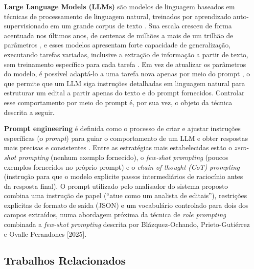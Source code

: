 \documentclass[12pt]{article}
\begin{document}
  \textbf{Large Language Models (LLMs)} são modelos de linguagem baseados em técnicas de processamento de linguagem natural, treinados por aprendizado auto-supervisionado em um grande corpus de texto \cite{b7}. Sua escala cresceu de forma acentuada nos últimos anos, de centenas de milhões a mais de um trilhão de parâmetros \cite{b7}, e esses modelos apresentam forte capacidade de generalização, executando tarefas variadas, inclusive a extração de informação a partir de texto, sem treinamento específico para cada tarefa \cite{b7}. Em vez de atualizar os parâmetros do modelo, é possível adaptá-lo a uma tarefa nova apenas por meio do prompt \cite{b5}, o que permite que um LLM siga instruções detalhadas em linguagem natural para estruturar um edital a partir apenas do texto e do prompt fornecidos. Controlar esse comportamento por meio do prompt é, por sua vez, o objeto da técnica descrita a seguir.

  \textbf{Prompt engineering} é definida como o processo de criar e ajustar instruções específicas (o \emph{prompt}) para guiar o comportamento de um LLM e obter respostas mais precisas e consistentes \cite{b5,b1}. Entre as estratégias mais estabelecidas estão o \emph{zero-shot prompting} (nenhum exemplo fornecido), o \emph{few-shot prompting} (poucos exemplos fornecidos no próprio prompt) e o \emph{chain-of-thought (CoT) prompting} (instrução para que o modelo explicite passos intermediários de raciocínio antes da resposta final). O prompt utilizado pelo analisador do sistema proposto combina uma instrução de papel (``atue como um analista de editais''), restrições explícitas de formato de saída (JSON) e um vocabulário controlado para dois dos campos extraídos, numa abordagem próxima da técnica de \emph{role prompting} combinada a \emph{few-shot prompting} descrita por Blázquez-Ochando, Prieto-Gutiérrez e Ovalle-Perandones [2025].

  \subsection{Trabalhos Relacionados}
\end{document}
